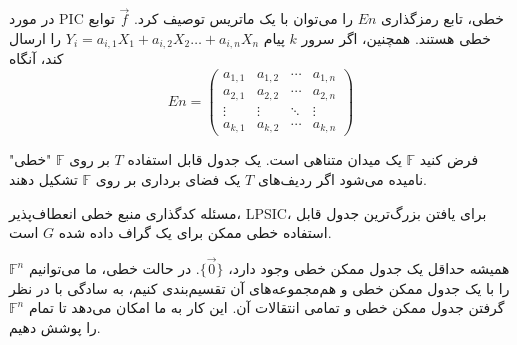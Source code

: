 \begin{note}
    در مورد PIC خطی، تابع رمزگذاری $En$ را می‌توان با یک ماتریس توصیف کرد. $\overrightarrow{f}$ توابع خطی هستند. همچنین، اگر سرور $k$ پیام $Y_i = a_{i,1} X_1 + a_{i,2} X_2 \ldots + a_{i,n} X_n$ را ارسال کند، آنگاه
    \begin{equation*}
        En =
        \begin{pmatrix}
            a_{1,1} & a_{1,2} & \cdots & a_{1,n} \\
            a_{2,1} & a_{2,2} & \cdots & a_{2,n} \\
            \vdots  & \vdots  & \ddots & \vdots  \\
            a_{k,1} & a_{k,2} & \cdots & a_{k,n}
        \end{pmatrix}
    \end{equation*}
\end{note}

\begin{definition}
    فرض کنید $\mathbb{F}$ یک میدان متناهی است. یک جدول قابل استفاده $T$ بر روی $\mathbb{F}$ "خطی" نامیده می‌شود اگر ردیف‌های $T$ یک فضای برداری بر روی $\mathbb{F}$ تشکیل دهند.
\end{definition}

مسئله کدگذاری منبع خطی انعطاف‌پذیر، LPSIC، برای یافتن بزرگ‌ترین جدول قابل استفاده خطی ممکن برای یک گراف داده شده $G$ است.

\begin{remark}
    همیشه حداقل یک جدول ممکن خطی وجود دارد، $\{\overrightarrow{0}\}$. در حالت خطی، ما می‌توانیم $\mathbb{F}^n$ را با یک جدول ممکن خطی و هم‌مجموعه‌های آن تقسیم‌بندی کنیم، به سادگی با در نظر گرفتن جدول ممکن خطی و تمامی انتقالات آن. این کار به ما امکان می‌دهد تا تمام $\mathbb{F}^n$ را پوشش دهیم.
\end{remark}

